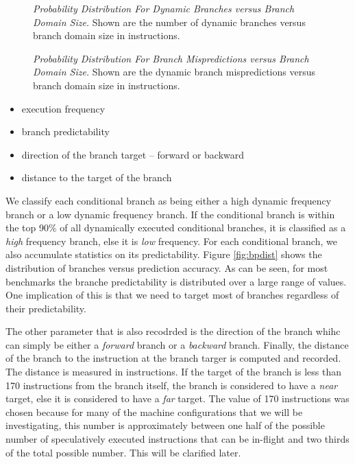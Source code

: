 \documentclass[10pt,dvips]{article}
\begin{document}
\begin{figure}
\vspace{0.2 in}
\setlength{\epsfxsize}{10cm}%
\centerline{}
\caption{{\em Probability Distribution For Dynamic Branches versus
Branch Domain Size.} 
Shown are the number of dynamic branches versus branch domain size
in instructions.}
\label{fig:numbranches}
\end{figure}

\begin{figure}
\vspace{0.2 in}
\setlength{\epsfxsize}{10cm}%
\centerline{}
\caption{{\em Probability Distribution For Branch Mispredictions
versus Branch Domain Size.} 
Shown are the dynamic branch mispredictions versus 
branch domain size
in instructions.}
\label{fig:mispredictions}
\end{figure}

\begin{itemize}
\item{execution frequency}
\item{branch predictability}
\item{direction of the branch target -- forward or backward}
\item{distance to the target of the branch}
\end{itemize}   

We classify each conditional branch as 
being either a high dynamic frequency branch
or a low dynamic frequency branch.  
If the conditional branch
is within the top 90\% of all dynamically executed conditional branches,
it is classified as a \textit{high} frequency branch, else it 
is \textit{low} frequency.
For each conditional branch, we also accumulate statistics on
its predictability.  Figure \ref{fig:bpdist} shows 
the distribution of branches versus prediction accuracy.
As can be seen, for most benchmarks
the branche predictability is distributed over a large range of values.
One implication of this is that we need to target most of branches 
regardless of their predictability.

The other parameter that is also recodrded is the direction of the branch 
whihc can simply
be either a 
\textit{forward} branch or a 
\textit{backward} branch.
Finally, the distance of the branch to 
the instruction at the
branch targer is computed and recorded.  The distance is measured
in instructions.  If the target of the branch is less than 170 instructions
from the branch itself, the branch is considered to have a 
\textit{near} target, else it is considered to have a
\textit{far} target.  The value of 170 instructions was chosen
because for many of the machine configurations that we will be
investigating, this number is approximately between one half of
the possible number of speculatively executed instructions
that can be in-flight and two thirds of the total possible number.
This will be clarified later.
\end{document}
